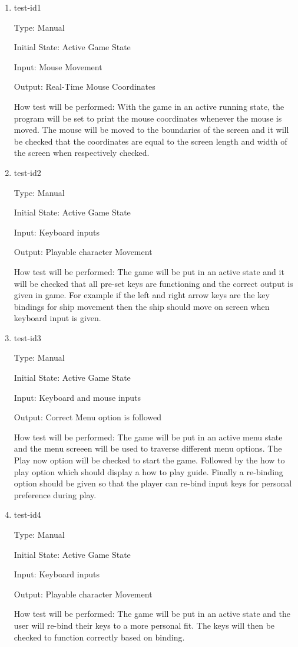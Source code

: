 \documentclass[12pt, titlepage]{article}
\begin{document}
\begin{enumerate}

\item{test-id1\\}

Type: Manual 
					
Initial State: Active Game State 
					
Input: Mouse Movement 
					
Output: Real-Time Mouse Coordinates 
					
How test will be performed: With the game in an active running state, the program will be set to print the mouse coordinates whenever the mouse is moved. The mouse will be moved to the boundaries of the screen and it will be checked that the coordinates are equal to the screen length and width of the screen when respectively checked.  
					
\item{test-id2\\}

Type: Manual 
					
Initial State: Active Game State 
					
Input: Keyboard inputs
					
Output: Playable character Movement
					
How test will be performed: The game will be put in an active state and it will be checked that all pre-set keys are functioning and the correct output is given in game. For example if the left and right arrow keys are the key bindings for ship movement then the ship should move on screen when keyboard input is given. 


\item{test-id3\\}

Type: Manual
					
Initial State: Active Game State
					
Input: Keyboard and mouse inputs 
					
Output: Correct Menu option is followed 
					
How test will be performed: The game will be put in an active menu state and the menu screeen will be used to traverse different menu options. The Play now option will be checked to start the game. Followed by the how to play option which should display a how to play guide. Finally a re-binding option should be given so that the player can re-bind input keys for personal preference during play. 


\item{test-id4\\}

Type: Manual

Initial State: Active Game State 

Input: Keyboard inputs

Output: Playable character Movement

How test will be performed: The game will be put in an active state and the user will re-bind their keys to a more personal fit. The keys will then be checked to function correctly based on binding. 

\end{enumerate}
\end{document}
